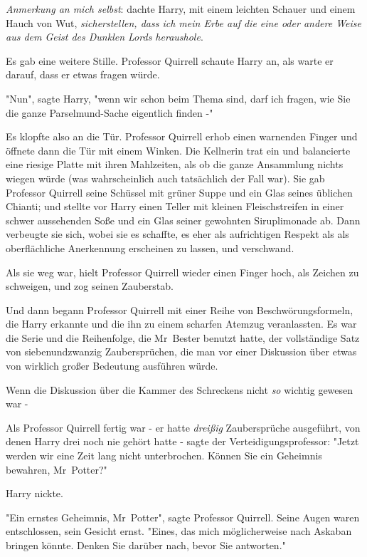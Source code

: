 {\emph{Anmerkung an mich selbst}: dachte Harry, mit einem leichten Schauer und einem Hauch von Wut, \emph{sicherstellen, dass ich mein Erbe auf die eine oder andere Weise aus dem Geist des Dunklen Lords heraushole}.

Es gab eine weitere Stille. Professor Quirrell schaute Harry an, als warte er darauf, dass er etwas fragen würde.

"Nun", sagte Harry, "wenn wir schon beim Thema sind, darf ich fragen, wie Sie die ganze Parselmund-Sache eigentlich finden -"

Es klopfte also an die Tür. Professor Quirrell erhob einen warnenden Finger und öffnete dann die Tür mit einem Winken. Die Kellnerin trat ein und balancierte eine riesige Platte mit ihren Mahlzeiten, als ob die ganze Ansammlung nichts wiegen würde (was wahrscheinlich auch tatsächlich der Fall war). Sie gab Professor Quirrell seine Schüssel mit grüner Suppe und ein Glas seines üblichen Chianti; und stellte vor Harry einen Teller mit kleinen Fleischstreifen in einer schwer aussehenden Soße und ein Glas seiner gewohnten Siruplimonade ab. Dann verbeugte sie sich, wobei sie es schaffte, es eher als aufrichtigen Respekt als als oberflächliche Anerkennung erscheinen zu lassen, und verschwand.

Als sie weg war, hielt Professor Quirrell wieder einen Finger hoch, als Zeichen zu schweigen, und zog seinen Zauberstab.

Und dann begann Professor Quirrell mit einer Reihe von Beschwörungsformeln, die Harry erkannte und die ihn zu einem scharfen Atemzug veranlassten. Es war die Serie und die Reihenfolge, die Mr~Bester benutzt hatte, der vollständige Satz von siebenundzwanzig Zaubersprüchen, die man vor einer Diskussion über etwas von wirklich großer Bedeutung ausführen würde.

Wenn die Diskussion über die Kammer des Schreckens nicht \emph{so} wichtig gewesen war -

Als Professor Quirrell fertig war - er hatte \emph{dreißig} Zaubersprüche ausgeführt, von denen Harry drei noch nie gehört hatte - sagte der Verteidigungsprofessor: "Jetzt werden wir eine Zeit lang nicht unterbrochen. Können Sie ein Geheimnis bewahren, Mr~Potter?"

Harry nickte.

"Ein ernstes Geheimnis, Mr~Potter", sagte Professor Quirrell. Seine Augen waren entschlossen, sein Gesicht ernst. "Eines, das mich möglicherweise nach Askaban bringen könnte. Denken Sie darüber nach, bevor Sie antworten."

}
